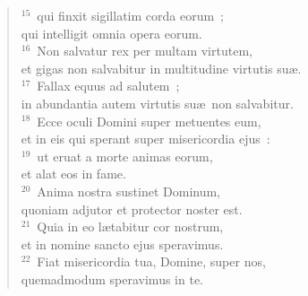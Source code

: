 \begin{flushleft}
\begin{verse}
${}^{15}$~qui finxit sigillatim corda eorum~;\\ qui intelligit omnia opera eorum.\\
${}^{16}$~Non salvatur rex per multam virtutem,\\ et gigas non salvabitur in multitudine virtutis su\ae .\\
${}^{17}$~Fallax equus ad salutem~;\\ in abundantia autem virtutis su\ae\ non salvabitur.\\
${}^{18}$~Ecce oculi Domini super metuentes eum,\\ et in eis qui sperant super misericordia ejus~:\\
${}^{19}$~ut eruat a morte animas eorum,\\ et alat eos in fame.\\
${}^{20}$~Anima nostra sustinet Dominum,\\ quoniam adjutor et protector noster est.\\
${}^{21}$~Quia in eo l\ae tabitur cor nostrum,\\ et in nomine sancto ejus speravimus.\\
${}^{22}$~Fiat misericordia tua, Domine, super nos,\\ quemadmodum speravimus in te.\end{verse}\end{flushleft}



